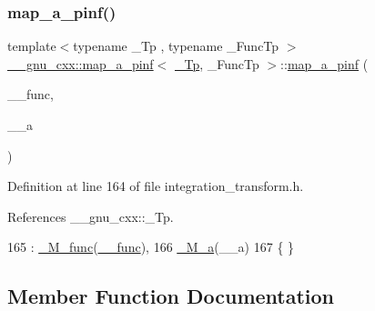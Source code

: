 \subsubsection{\texorpdfstring{map\+\_\+a\+\_\+pinf()}{map\_a\_pinf()}}
{\footnotesize\ttfamily template$<$typename \+\_\+\+Tp , typename \+\_\+\+Func\+Tp $>$ \\
\hyperlink{struct____gnu__cxx_1_1map__a__pinf}{\+\_\+\+\_\+gnu\+\_\+cxx\+::map\+\_\+a\+\_\+pinf}$<$ \hyperlink{namespace____gnu__cxx_a3b19a9c800ca194374ef9172290f7d79}{\+\_\+\+Tp}, \+\_\+\+Func\+Tp $>$\+::\hyperlink{struct____gnu__cxx_1_1map__a__pinf}{map\+\_\+a\+\_\+pinf} (\begin{DoxyParamCaption}\item[{\+\_\+\+Func\+Tp}]{\+\_\+\+\_\+func,  }\item[{\hyperlink{namespace____gnu__cxx_a3b19a9c800ca194374ef9172290f7d79}{\+\_\+\+Tp}}]{\+\_\+\+\_\+a }\end{DoxyParamCaption})\hspace{0.3cm}{\ttfamily [inline]}}



Definition at line 164 of file integration\+\_\+transform.\+h.



References \+\_\+\+\_\+gnu\+\_\+cxx\+::\+\_\+\+Tp.


\begin{DoxyCode}
165       : \hyperlink{struct____gnu__cxx_1_1map__a__pinf_a5e842585fa430caa329cb26a4976ee88}{\_M\_func}(\hyperlink{namespace____gnu__cxx_af2b2f0c7a2ae72b922b1afefae5a65b2}{\_\_func}),
166         \hyperlink{struct____gnu__cxx_1_1map__a__pinf_a1de7ffe1b5ac3d528cb472ced4878f27}{\_M\_a}(\_\_a)
167       \{ \}
\end{DoxyCode}


\subsection{Member Function Documentation}
\mbox{\label{struct____gnu__cxx_1_1map__a__pinf_afaf0f54109c7c496ce44603389bb495b}} 
